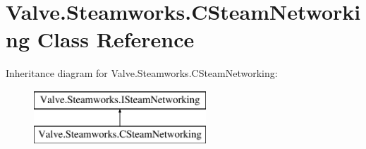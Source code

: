 \hypertarget{classValve_1_1Steamworks_1_1CSteamNetworking}{}\section{Valve.\+Steamworks.\+C\+Steam\+Networking Class Reference}
\label{classValve_1_1Steamworks_1_1CSteamNetworking}
Inheritance diagram for Valve.\+Steamworks.\+C\+Steam\+Networking\+:\begin{figure}[H]
\begin{center}
\leavevmode
\includegraphics[height=2.000000cm]{classValve_1_1Steamworks_1_1CSteamNetworking}
\end{center}
\end{figure}
